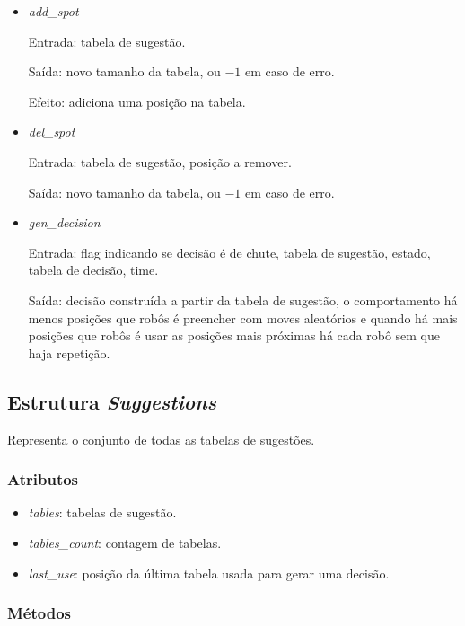\begin{itemize}
  \item \textit{add_spot}
    \par Entrada: tabela de sugestão.
    \par Saída: novo tamanho da tabela, ou $-1$ em caso de erro.
    \par Efeito: adiciona uma posição na tabela.
  \item \textit{del_spot}
    \par Entrada: tabela de sugestão, posição a remover.
    \par Saída: novo tamanho da tabela, ou $-1$ em caso de erro.
  \item \textit{gen_decision}
    \par Entrada: flag indicando se decisão é de chute, tabela de sugestão,
    estado, tabela de decisão, time.
    \par Saída: decisão construída a partir da tabela de sugestão, o
    comportamento há menos posições que robôs é preencher com moves aleatórios e
    quando há mais posições que robôs é usar as posições mais próximas há cada
    robô sem que haja repetição.
\end{itemize}

\subsection*{Estrutura \textit{Suggestions}}

Representa o conjunto de todas as tabelas de sugestões.

\subsubsection*{Atributos}

\begin{itemize}
  \item \textit{tables}: tabelas de sugestão.
  \item \textit{tables_count}: contagem de tabelas.
  \item \textit{last_use}: posição da última tabela usada para gerar uma decisão.
\end{itemize}

\subsubsection*{Métodos}

